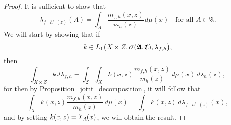 \documentclass[
twoside=true,
paper=letter,
fontsize=11pt,
pagesize=auto,
leqno,
openany,
headsepline,
overfullrule,
]{scrbook}
\theoremstyle{plain}
\theoremstyle{plain}
\theoremstyle{definition}
\theoremstyle{bfnoteitalic}
\theoremstyle{bfnoteroman}
\newcommand{\sigalg}[1]{\mathfrak{#1}}
\newcommand{\sagb}{\mathop{\hbox{\large{$\sigma$}}}\nolimits}
\newcommand{\charfunction}[1]{{\raisebox{2pt}{$\chi$}}_{#1}}
\newcommand{\preimage}[1]{#1^{\leftarrow}}
\newcommand{\sigmaalgebra}{\sigalg{A}}
\newcommand{\sigmaalgebraiii}{\sigalg{C}}
\newcommand{\productsig}[2]{\sagb(#1,#2)}
\newcommand{\function}{f}
\newcommand{\functioniii}{h}
\newcommand{\functioniv}{k}
\newcommand{\measurespace}{X}
\newcommand{\measurespaceiii}{Z}
\newcommand{\mspaceelt}{x}
\newcommand{\mspaceeltiii}{z}
\newcommand{\measure}{\mu}
\newcommand{\measureiii}{\lambda}
\newcommand{\seti}{A}
\begin{document}
\begin{proof}
It is sufficient to show that
\[
\measureiii_{\function\mid\preimage{\functioniii}(\mspaceeltiii)}(\seti)
=
\int_\seti 
\frac{m_{\function,\functioniii}(\mspaceelt,\mspaceeltiii)}
{m_\functioniii (\mspaceeltiii)}
\,d\measure(\mspaceelt)
\quad\text{for all $\seti\in\sigmaalgebra$.}
\]
We will start by showing that if
\[
\functioniv\in
L_1\bigl(\measurespace\times\measurespaceiii,
\productsig{\sigmaalgebra}{\sigmaalgebraiii},
\measureiii_{\function,\functioniii}\bigr),
\]
then
\[
\int_{\measurespace\times\measurespaceiii}
\functioniv \,d\measureiii_{\function,\functioniii}
= 
\int_\measurespaceiii \int_\measurespace
\functioniv(\mspaceelt,\mspaceeltiii)
\frac{m_{\function,\functioniii}(\mspaceelt,\mspaceeltiii)}
{m_\functioniii (\mspaceeltiii)}
\,d\measure (\mspaceelt)
\,d\measureiii_\functioniii (\mspaceeltiii),
\]
for then by Proposition~\ref{joint_decomposition}, it will follow that
\[
\int_\measurespace
\functioniv(\mspaceelt,\mspaceeltiii)
\frac{m_{\function,\functioniii}(\mspaceelt,\mspaceeltiii)}
{m_\functioniii (\mspaceeltiii)}
\,d\measure (\mspaceelt)
=
\int_\measurespace
\functioniv(\mspaceelt,\mspaceeltiii)
\,d\measureiii_{\function\mid\preimage{\functioniii}(\mspaceeltiii)}(\mspaceelt),
\]
and by setting $\functioniv(\mspaceelt,\mspaceeltiii)=\charfunction{\seti}(\mspaceelt)$, 
we will obtain the result.


\end{proof}
\end{document}
